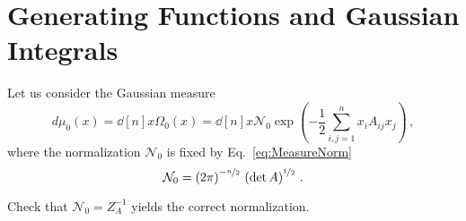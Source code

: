 \documentclass[notes.tex]{subfiles}
\begin{document}
\section{Generating Functions and Gaussian Integrals}
\label{sec:gener-funct-gauss}

Let us consider the Gaussian measure
\begin{equation}
  \label{eq:GaussMeas}
  d\mu_0(x) = \dd[n]{x} \Omega_0(x) = \dd[n]{x} \mathcal{N}_0 \exp\left(
  -\frac12 \sum_{i,j=1}^n x_i A_{ij} x_j
  \right)\, ,
\end{equation}
where the normalization $\mathcal{N}_0$ is fixed by Eq.~\ref{eq:MeasureNorm}
\begin{equation}
  \label{eq:GaussNorm}
  \mathcal{N}_0 = \left(2\pi\right)^{-\nicefrac{n}{2}}\, \left( \det A\right)^{\nicefrac{1}{2}}\, .
\end{equation}

\begin{Ex}
  Check that $\mathcal{N}_0=Z_A^{-1}$ yields the correct normalization.
\end{Ex}
\end{document}
